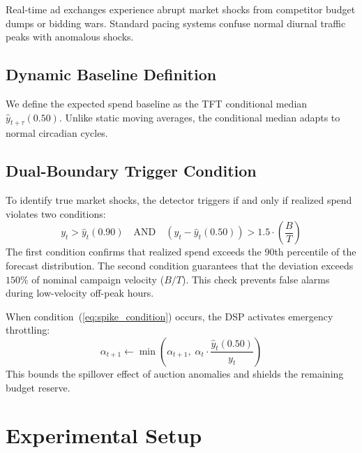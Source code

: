 \documentclass[sigconf]{acmart}
\begin{document}
Real-time ad exchanges experience abrupt market shocks from competitor budget dumps or bidding wars. Standard pacing systems confuse normal diurnal traffic peaks with anomalous shocks.

\subsection{Dynamic Baseline Definition}
We define the expected spend baseline as the TFT conditional median $\hat{y}_{t+\tau}(0.50)$. Unlike static moving averages, the conditional median adapts to normal circadian cycles.

\subsection{Dual-Boundary Trigger Condition}
To identify true market shocks, the detector triggers if and only if realized spend violates two conditions:
\begin{equation}
    y_t > \hat{y}_t(0.90) \quad \text{AND} \quad \left(y_t - \hat{y}_t(0.50)\right) > 1.5 \cdot \left(\frac{B}{T}\right)
    \label{eq:spike_condition}
\end{equation}
The first condition confirms that realized spend exceeds the 90th percentile of the forecast distribution. The second condition guarantees that the deviation exceeds $150\%$ of nominal campaign velocity ($B/T$). This check prevents false alarms during low-velocity off-peak hours.

When condition~(\ref{eq:spike_condition}) occurs, the DSP activates emergency throttling:
\begin{equation}
    \alpha_{t+1} \leftarrow \min\left(\alpha_{t+1}, \; \alpha_t \cdot \frac{\hat{y}_t(0.50)}{y_t}\right)
\end{equation}
This bounds the spillover effect of auction anomalies and shields the remaining budget reserve.

\section{Experimental Setup}
\end{document}
